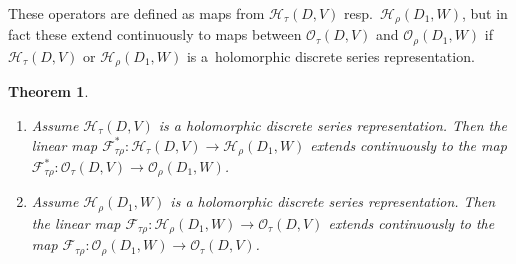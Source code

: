 \documentclass[11pt]{article}
\numberwithin{equation}{section}
\newtheorem{Theorem}{Theorem}[section]
\newcommand{\cF}{\mathcal{F}}
\newcommand{\cH}{\mathcal{H}}
\newcommand{\cO}{\mathcal{O}}
\begin{document}
These operators are defined as maps from $\cH_\tau(D,V)$ resp.~$\cH_\rho(D_1,W)$, but in fact these extend continuously to maps between
$\cO_\tau(D,V)$ and $\cO_\rho(D_1,W)$ if $\cH_\tau(D,V)$ or $\cH_\rho(D_1,W)$ is a~holomorphic discrete series representation.
\begin{Theorem}\label{conti_ext}\quad
\begin{enumerate}\itemsep=0pt
\item[$(1)$] Assume $\cH_\tau(D,V)$ is a holomorphic discrete series representation. Then
the linear map $\cF_{\tau\rho}^*\colon\! \cH_\tau(D,V)\!\to\!\cH_\rho(D_1{,}W)$ extends continuously to the map $\cF_{\tau\rho}^*\colon\! \cO_\tau(D,V)\!\to\!\cO_\rho(D_1{,}W)$.
\item[$(2)$] Assume $\cH_\rho(D_1,W)$ is a holomorphic discrete series representation. Then
the linear map $\cF_{\tau\rho}\colon\! \cH_\rho(D_1,W)\!\to\! \cO_\tau(D{,}V)$ extends continuously to the map $\cF_{\tau\rho}\colon\! \cO_\rho(D_1,W)\!\to \! \cO_\tau(D{,}V)$.
\end{enumerate}
\end{Theorem}
\end{document}
